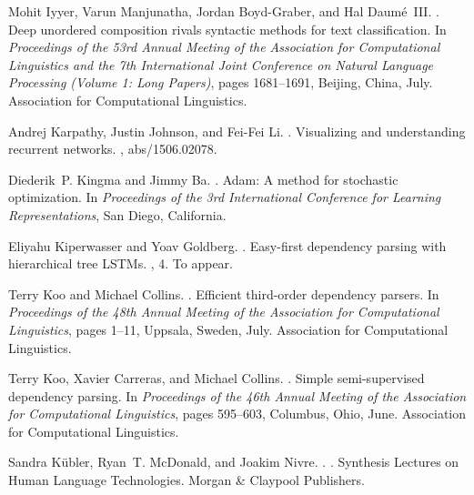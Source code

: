 \documentclass[11pt]{article}
\begin{document}
\begin{thebibliography}{}
Mohit Iyyer, Varun Manjunatha, Jordan Boyd-Graber, and Hal Daum\'{e}~III.
.
\newblock Deep unordered composition rivals syntactic methods for text
  classification.
\newblock In {\em Proceedings of the 53rd Annual Meeting of the Association for
  Computational Linguistics and the 7th International Joint Conference on
  Natural Language Processing (Volume 1: Long Papers)}, pages 1681--1691,
  Beijing, China, July. Association for Computational Linguistics.

Andrej Karpathy, Justin Johnson, and Fei{-}Fei Li.
.
\newblock Visualizing and understanding recurrent networks.
, abs/1506.02078.

Diederik~P. Kingma and Jimmy Ba.
.
\newblock Adam: {A} method for stochastic optimization.
\newblock In {\em Proceedings of the 3rd International Conference for Learning
  Representations}, San Diego, California.

Eliyahu Kiperwasser and Yoav Goldberg.
.
\newblock Easy-first dependency parsing with hierarchical tree {LSTMs}.
,
  4.
\newblock To appear.

Terry Koo and Michael Collins.
.
\newblock Efficient third-order dependency parsers.
\newblock In {\em Proceedings of the 48th Annual Meeting of the Association for
  Computational Linguistics}, pages 1--11, Uppsala, Sweden, July. Association
  for Computational Linguistics.

Terry Koo, Xavier Carreras, and Michael Collins.
.
\newblock Simple semi-supervised dependency parsing.
\newblock In {\em Proceedings of the 46th Annual Meeting of the Association for
  Computational Linguistics}, pages 595--603, Columbus, Ohio, June. Association
  for Computational Linguistics.

Sandra K{\"{u}}bler, Ryan~T. McDonald, and Joakim Nivre.
.
.
\newblock Synthesis Lectures on Human Language Technologies. Morgan {\&}
  Claypool Publishers.


\end{thebibliography}
\end{document}
